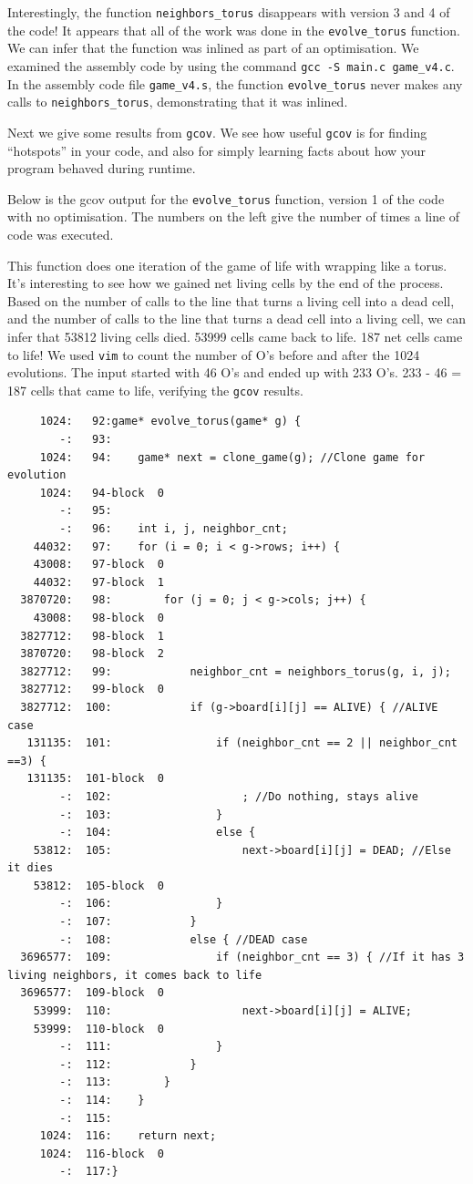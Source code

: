 \documentclass{article}
\begin{document}
Interestingly, the function \verb=neighbors_torus= disappears with version 3 and 4 of the code! It appears that all of the work was done in the \verb=evolve_torus= function. We can infer that the function was inlined as part of an optimisation. We examined the assembly code by using the command \verb=gcc -S main.c game_v4.c=. In the assembly code file \verb=game_v4.s=, the function \verb=evolve_torus= never makes any calls to \verb=neighbors_torus=, demonstrating that it was inlined.  

Next we give some results from \verb=gcov=. We see how useful \verb=gcov= is for finding ``hotspots'' in your code, and also for simply learning facts about how your program behaved during runtime.
  
Below is the gcov output for the \verb=evolve_torus= function, version 1 of the code with no optimisation. The numbers on the left give the number of times a line of code was executed.

This function does one iteration of the game of life with wrapping like a torus.
It's interesting to see how we gained net living cells by the end of the process.
Based on the number of calls to the line that turns a living cell into a dead cell, and the number of calls to the line that turns a dead cell into a living cell, we can infer that
53812 living cells died. 53999 cells came back to life. 187 net cells came to life!
	We used \verb=vim= to count the number of O's before and after the 1024 evolutions. The input started with 46 O's and ended up with 233 O's. 233 - 46 = 187 cells that came to life, verifying the \verb=gcov= results. 
\newpage
\begin{verbatim}
     1024:   92:game* evolve_torus(game* g) {
        -:   93:
     1024:   94:    game* next = clone_game(g); //Clone game for evolution
     1024:   94-block  0
        -:   95:
        -:   96:    int i, j, neighbor_cnt;
    44032:   97:    for (i = 0; i < g->rows; i++) {
    43008:   97-block  0
    44032:   97-block  1
  3870720:   98:        for (j = 0; j < g->cols; j++) {
    43008:   98-block  0
  3827712:   98-block  1
  3870720:   98-block  2
  3827712:   99:            neighbor_cnt = neighbors_torus(g, i, j);
  3827712:   99-block  0
  3827712:  100:            if (g->board[i][j] == ALIVE) { //ALIVE case
   131135:  101:                if (neighbor_cnt == 2 || neighbor_cnt ==3) {
   131135:  101-block  0
        -:  102:                    ; //Do nothing, stays alive
        -:  103:                }
        -:  104:                else {
    53812:  105:                    next->board[i][j] = DEAD; //Else it dies
    53812:  105-block  0
        -:  106:                }   
        -:  107:            }   
        -:  108:            else { //DEAD case
  3696577:  109:                if (neighbor_cnt == 3) { //If it has 3 living neighbors, it comes back to life
  3696577:  109-block  0
    53999:  110:                    next->board[i][j] = ALIVE; 
    53999:  110-block  0
        -:  111:                }   
        -:  112:            }   
        -:  113:        }   
        -:  114:    }   
        -:  115:
     1024:  116:    return next; 
     1024:  116-block  0
        -:  117:}
\end{verbatim}
\end{document}
